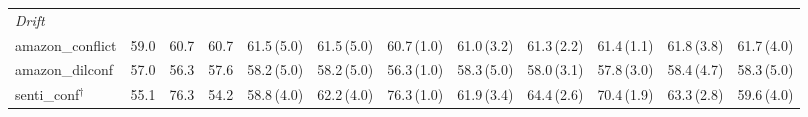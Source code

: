 \begin{table}[t]
{\begin{tabular}{lrrrrrrrrrrr}
\multicolumn{12}{l}{\emph{Drift}}\\
amazon\_conflict & 59.0 & 60.7 & 60.7 & 61.5\,{\scriptsize(5.0)} & 61.5\,{\scriptsize(5.0)} & 60.7\,{\scriptsize(1.0)} & 61.0\,{\scriptsize(3.2)} & 61.3\,{\scriptsize(2.2)} & 61.4\,{\scriptsize(1.1)} & 61.8\,{\scriptsize(3.8)} & 61.7\,{\scriptsize(4.0)}\\
amazon\_dilconf & 57.0 & 56.3 & 57.6 & 58.2\,{\scriptsize(5.0)} & 58.2\,{\scriptsize(5.0)} & 56.3\,{\scriptsize(1.0)} & 58.3\,{\scriptsize(5.0)} & 58.0\,{\scriptsize(3.1)} & 57.8\,{\scriptsize(3.0)} & 58.4\,{\scriptsize(4.7)} & 58.3\,{\scriptsize(5.0)}\\
senti\_conf$^\dagger$ & 55.1 & 76.3 & 54.2 & 58.8\,{\scriptsize(4.0)} & 62.2\,{\scriptsize(4.0)} & 76.3\,{\scriptsize(1.0)} & 61.9\,{\scriptsize(3.4)} & 64.4\,{\scriptsize(2.6)} & 70.4\,{\scriptsize(1.9)} & 63.3\,{\scriptsize(2.8)} & 59.6\,{\scriptsize(4.0)}\\
\bottomrule\end{tabular}}
\end{table}
